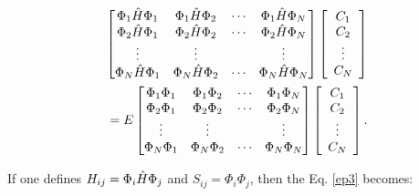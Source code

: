 \documentclass[a4paper, 12pt, titlepage,oneside,drop]{kthesis}
\begin{document}
\begin{equation}\begin{split}\label{ep3}
\left[
\begin{matrix}
    \Phi_1 \hat{H} \Phi_1 & \Phi_1 \hat{H} \Phi_2 & \cdots & \Phi_1 \hat{H} \Phi_N \\
    \Phi_2 \hat{H} \Phi_1 & \Phi_2 \hat{H} \Phi_2 & \cdots & \Phi_2 \hat{H} \Phi_N \\
    \vdots               & \vdots               &        & \vdots               \\
    \Phi_N \hat{H} \Phi_1 & \Phi_N \hat{H} \Phi_2 & \cdots & \Phi_N \hat{H} \Phi_N \\
\end{matrix} \right] \left[ \begin{array}{c} C_1 \\ C_2 \\ \vdots \\ C_N\end{array} \right] \\
=E \left[
\begin{matrix}
    \Phi_1 \Phi_1 & \Phi_1 \Phi_2 & \cdots & \Phi_1 \Phi_N \\
   \Phi_2 \Phi_1 & \Phi_2 \Phi_2 & \cdots & \Phi_2 \Phi_N \\
    \vdots               & \vdots               &        & \vdots               \\
   \Phi_N \Phi_1 & \Phi_N \Phi_2 & \cdots & \Phi_N \Phi_N \\
\end{matrix} \right]\left[ \begin{array}{c} C_1 \\ C_2 \\ \vdots \\ C_N\end{array} \right].
\end{split}\end{equation}

If one defines $H_{ij} = \Phi_i \hat{H} \Phi_j$ and $S_{ij} = \Phi_i \Phi_j$, then the Eq. \ref{ep3} becomes:
\end{document}

